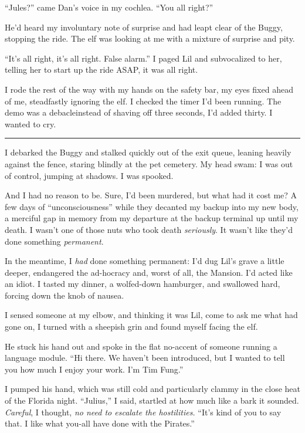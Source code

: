 “Jules?” came Dan's voice in my cochlea. “You all right?”

He'd heard my involuntary note of surprise and had leapt clear of
the Buggy, stopping the ride. The elf was looking at me with a
mixture of surprise and pity.

“It's all right, it's all right. False alarm.” I paged Lil and
subvocalized to her, telling her to start up the ride ASAP, it was
all right.

I rode the rest of the way with my hands on the safety bar, my eyes
fixed ahead of me, steadfastly ignoring the elf. I checked the
timer I'd been running. The demo was a debacle{\dash}instead of shaving
off three seconds, I'd added thirty. I wanted to cry.

\begin{center}\rule{3in}{0.4pt}\end{center}

I debarked the Buggy and stalked quickly out of the exit queue,
leaning heavily against the fence, staring blindly at the pet
cemetery. My head swam: I was out of control, jumping at shadows. I
was spooked.

And I had no reason to be. Sure, I'd been murdered, but what had it
cost me? A few days of “unconsciousness” while they decanted my
backup into my new body, a merciful gap in memory from my departure
at the backup terminal up until my death. I wasn't one of those
nuts who took death \emph{seriously}. It wasn't like they'd done
something \emph{permanent}.

In the meantime, I \emph{had} done something permanent: I'd dug
Lil's grave a little deeper, endangered the ad-hocracy and, worst
of all, the Mansion. I'd acted like an idiot. I tasted my dinner, a
wolfed-down hamburger, and swallowed hard, forcing down the knob of
nausea.

I sensed someone at my elbow, and thinking it was Lil, come to ask
me what had gone on, I turned with a sheepish grin and found myself
facing the elf.

He stuck his hand out and spoke in the flat no-accent of someone
running a language module. “Hi there. We haven't been introduced,
but I wanted to tell you how much I enjoy your work. I'm Tim
Fung.”

I pumped his hand, which was still cold and particularly clammy in
the close heat of the Florida night. “Julius,” I said, startled at
how much like a bark it sounded. \emph{Careful}, I thought,
\emph{no need to escalate the hostilities.} “It's kind of you to
say that. I like what you-all have done with the Pirates.”

